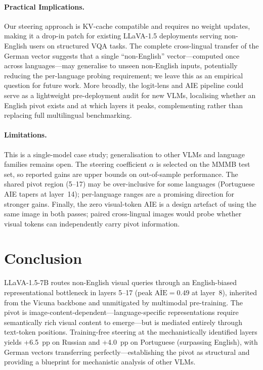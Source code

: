 \documentclass[11pt]{article}
\begin{document}
\paragraph{Practical Implications.}
Our steering approach is KV-cache compatible and requires no weight updates,
making it a drop-in patch for existing LLaVA-1.5 deployments serving
non-English users on structured VQA tasks.
The complete cross-lingual transfer of the German vector suggests that
a single ``non-English'' vector---computed once across languages---may
generalise to unseen non-English inputs, potentially reducing the
per-language probing requirement; we leave this as an empirical question
for future work.
More broadly, the logit-lens and AIE pipeline could serve as a lightweight
pre-deployment audit for new VLMs, localising whether an English pivot
exists and at which layers it peaks, complementing rather than replacing
full multilingual benchmarking.

\paragraph{Limitations.}
This is a single-model case study; generalisation to other VLMs and language
families remains open.
The steering coefficient $\alpha$ is selected on the MMMB test set, so reported
gains are upper bounds on out-of-sample performance.
The shared pivot region (5--17) may be over-inclusive for some languages
(Portuguese AIE tapers at layer~14); per-language ranges are a promising
direction for stronger gains.
Finally, the zero visual-token AIE is a design artefact of using the same
image in both passes; paired cross-lingual images would probe whether visual
tokens can independently carry pivot information.

\section{Conclusion}

LLaVA-1.5-7B routes non-English visual queries through an English-biased
representational bottleneck in layers 5--17 (peak $\overline{\mathrm{AIE}}{=}0.49$
at layer~8), inherited from the Vicuna backbone and unmitigated by multimodal
pre-training.
The pivot is image-content-dependent---language-specific representations
require semantically rich visual content to emerge---but is mediated
entirely through text-token positions.
Training-free steering at the mechanistically identified layers yields
+6.5~pp on Russian and +4.0~pp on Portuguese (surpassing English), with
German vectors transferring perfectly---establishing the pivot as structural
and providing a blueprint for mechanistic analysis of other VLMs.
\end{document}
